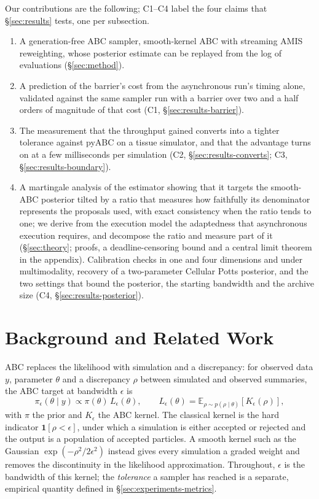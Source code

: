 \documentclass[10pt]{article}
\theoremstyle{plain}
\theoremstyle{definition}
\begin{document}
Our contributions are the following; C1--C4 label the four claims that \S\ref{sec:results} tests, one per subsection.
\begin{enumerate}
\item A generation-free ABC sampler, smooth-kernel ABC with streaming AMIS reweighting, whose posterior estimate can be replayed from the log of evaluations (\S\ref{sec:method}).
\item A prediction of the barrier's cost from the asynchronous run's timing alone, validated against the same sampler run with a barrier over two and a half orders of magnitude of that cost (C1, \S\ref{sec:results-barrier}).
\item The measurement that the throughput gained converts into a tighter tolerance against pyABC on a tissue simulator, and that the advantage turns on at a few milliseconds per simulation (C2, \S\ref{sec:results-converts}; C3, \S\ref{sec:results-boundary}).
\item A martingale analysis of the estimator showing that it targets the smooth-ABC posterior tilted by a ratio that measures how faithfully its denominator represents the proposals used, with exact consistency when the ratio tends to one; we derive from the execution model the adaptedness that asynchronous execution requires, and decompose the ratio and measure part of it (\S\ref{sec:theory}; proofs, a deadline-censoring bound and a central limit theorem in the appendix). Calibration checks in one and four dimensions and under multimodality, recovery of a two-parameter Cellular Potts posterior, and the two settings that bound the posterior, the starting bandwidth and the archive size (C4, \S\ref{sec:results-posterior}).
\end{enumerate}

\section{Background and Related Work}\label{sec:background}\label{sec:background-abc}\label{sec:background-sequential}\label{sec:background-amis}\label{sec:background-distributed}
ABC replaces the likelihood with simulation and a discrepancy: for observed data $y$, parameter $\theta$ and a discrepancy $\rho$ between simulated and observed summaries, the ABC target at bandwidth $\epsilon$ is
\begin{equation}
\pi_{\epsilon}(\theta \mid y) \propto \pi(\theta)\, L_{\epsilon}(\theta),
\qquad
L_{\epsilon}(\theta) = \mathbb{E}_{\rho \sim p(\rho \mid \theta)}\!\left[K_{\epsilon}(\rho)\right],
\label{eq:abc-target}
\end{equation}
with $\pi$ the prior and $K_\epsilon$ the ABC kernel. The classical kernel is the hard indicator $\mathbf{1}[\rho<\epsilon]$, under which a simulation is either accepted or rejected and the output is a population of accepted particles. A smooth kernel such as the Gaussian $\exp(-\rho^2/2\epsilon^2)$ \citep{wilkinson2013,fearnhead2012} instead gives every simulation a graded weight and removes the discontinuity in the likelihood approximation. Throughout, $\epsilon$ is the bandwidth of this kernel; the \emph{tolerance} a sampler has reached is a separate, empirical quantity defined in \S\ref{sec:experiments-metrics}.
\end{document}
